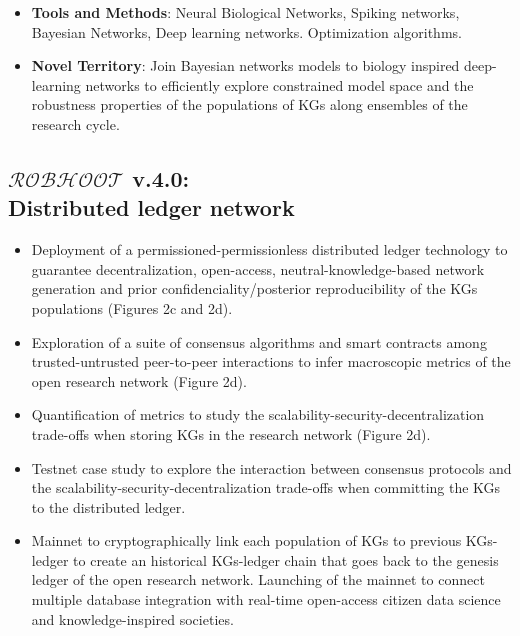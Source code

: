 \documentclass[10pt, a4paper, twocolumn]{article} %
\begin{document}
{ \begin{itemize}
 \item {\bf Tools and Methods}: Neural Biological Networks, Spiking
   networks, Bayesian Networks, Deep learning networks. Optimization
   algorithms.
 \end{itemize}

  \begin{itemize}
  \item {\bf Novel Territory}: Join Bayesian networks models to
    biology inspired deep-learning networks to efficiently explore
    constrained model space and the robustness properties of the
    populations of KGs along ensembles of the research cycle.
   \end{itemize}
  
  
  \subsection{{\bf $\mathcal{ROBHOOT}$ v.4.0}: \\ Distributed ledger
    network}
  \begin{itemize}
  \item Deployment of a permissioned-permissionless distributed ledger
    technology to guarantee decentralization, open-access,
    neutral-knowledge-based network generation and prior
    confidenciality/posterior reproducibility of the KGs populations
    (Figures 2c and 2d).
  \item Exploration of a suite of consensus algorithms and smart
    contracts among trusted-untrusted peer-to-peer interactions to
    infer macroscopic metrics of the open research network (Figure
    2d).
  \item Quantification of metrics to study the
    scalability-security-decentralization trade-offs when storing KGs
    in the research network (Figure 2d).
  \item Testnet case study to explore the interaction between
    consensus protocols and the scalability-security-decentralization
    trade-offs when committing the KGs to the distributed ledger.
  \item Mainnet to cryptographically link each population of KGs to
    previous KGs-ledger to create an historical KGs-ledger chain that
    goes back to the genesis ledger of the open research
    network. Launching of the mainnet to connect multiple database
    integration with real-time open-access citizen data science and
    knowledge-inspired societies.
  \end{itemize}

}
\end{document}
